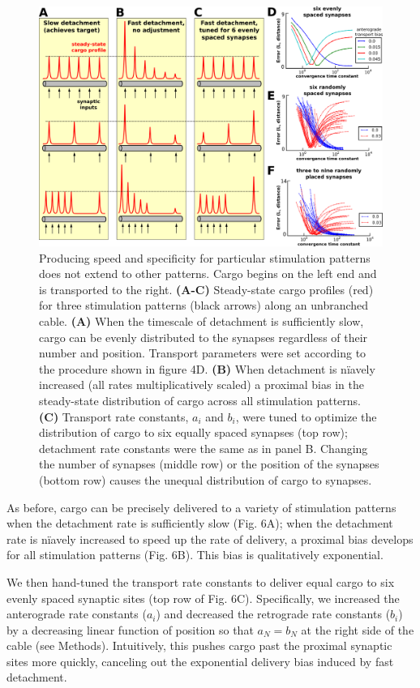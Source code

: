 \documentclass[10pt]{wlpeerj}
\begin{document}
\begin{figure}[!tb]
\begin{center}
\includegraphics[width=0.9\columnwidth]{06_heterosynaptic_cable.png}
\caption{Producing speed and specificity for particular stimulation patterns does not extend to other patterns. Cargo begins on the left end and is transported to the right.
\textbf{(A-C)} Steady-state cargo profiles (red) for three stimulation patterns (black arrows) along an unbranched cable.
\textbf{(A)} When the timescale of detachment is sufficiently slow, cargo can be evenly distributed to the synapses regardless of their number and position. Transport parameters were set according to the procedure shown in figure 4D.
\textbf{(B)} When detachment is n\"iavely increased (all rates multiplicatively scaled) a proximal bias in the steady-state distribution of cargo across all stimulation patterns.
\textbf{(C)} Transport rate constants, $a_i$ and $b_i$, were tuned to optimize the distribution of cargo to six equally spaced synapses (top row); detachment rate constants were the same as in panel B. Changing the number of synapses (middle row) or the position of the synapses (bottom row) causes the unequal distribution of cargo to synapses.
}
\end{center}
\end{figure}

As before, cargo can be precisely delivered to a variety of stimulation patterns when the detachment rate is sufficiently slow (Fig. 6A); when the detachment rate is n\"iavely increased to speed up the rate of delivery, a proximal bias develops for all stimulation patterns (Fig. 6B).
This bias is qualitatively exponential.

We then hand-tuned the transport rate constants to deliver equal cargo to six evenly spaced synaptic sites (top row of Fig. 6C).
Specifically, we increased the anterograde rate constants ($a_i$) and decreased the retrograde rate constants ($b_i$) by a decreasing linear function of position so that $a_N = b_N$ at the right side of the cable (see Methods).
Intuitively, this pushes cargo past the proximal synaptic sites more quickly, canceling out the exponential delivery bias induced by fast detachment.
\end{document}
